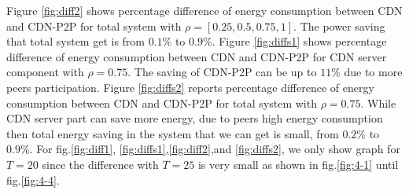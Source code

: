 \documentclass[conference]{IEEEtran}
\begin{document}
Figure \ref{fig:diff2} shows percentage difference of energy consumption between CDN and CDN-P2P for total system with $\rho=[0.25,0.5,0.75,1]$.
The power saving that total system get is from $0.1\%$ to $0.9\%$.
Figure \ref{fig:diffs1} shows percentage difference of energy consumption between CDN and CDN-P2P for CDN server component with $\rho=0.75$.
The saving of CDN-P2P can be up to $11\%$ due to more peers participation. 
Figure \ref{fig:diffs2} reports percentage difference of energy consumption between CDN and CDN-P2P for total system with $\rho=0.75$.
While CDN server part can save more energy, due to peers high energy consumption then total energy saving in the system that we can get is small, from $0.2\%$ to $0.9\%$.
For fig.\ref{fig:diff1}, \ref{fig:diffs1},\ref{fig:diff2},and \ref{fig:diffs2}, we only show graph for $T=20$ since the difference with $T=25$ is very small as shown in fig.\ref{fig:4-1} until fig.\ref{fig:4-4}.
\end{document}
